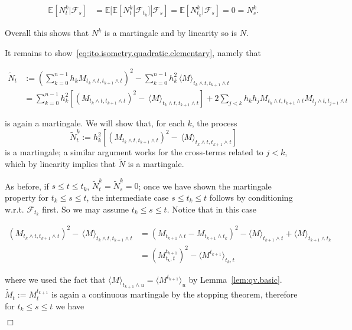 \documentclass{article}
\newcommand{\coloneq}{:=}
\newcommand{\textbf}[1]{\text{{\bfseries{#1}}}}
\newenvironment{proof}{\noindent\textbf{Proof\ }}{\hspace*{\fill}$\Box$\medskip}
\newcommand{\1}{\1}
\begin{document}
{\begin{proof}
  \begin{align*}
    \mathbb{E} [N^k_t | \mathcal{F}_s] & =\mathbb{E} [\mathbb{E} [N^k_t |
    \mathcal{F}_{t_k}] | \mathcal{F}_s] =\mathbb{E} [N^k_{t_k} |
    \mathcal{F}_s] = 0 = N^k_s .
  \end{align*}
  
  Overall this shows that $N^k$ is a martingale and by linearity so is $N$.
  
  It remains to show~\eqref{eq:ito.isometry.quadratic.elementary}, namely that
  
  \begin{align*}
    \tilde{N}_t & \coloneq \left( \sum_{k = 0}^{n - 1} h_k M_{t_k \wedge t,
    t_{k + 1} \wedge t} \right)^2 - \sum_{k = 0}^{n - 1} h_k^2 \, \langle M
    \rangle_{t_k \wedge t, t_{k + 1} \wedge t}\\
    & = \sum_{k = 0}^{n - 1} h_k^2 \left[ (M_{t_k \wedge t, t_{k + 1} \wedge
    t})^2 - \, \langle M \rangle_{t_k \wedge t, t_{k + 1} \wedge t} \right] +
    2 \sum_{j < k} h_k h_j M_{t_k \wedge t, t_{k + 1} \wedge t} M_{t_j \wedge
    t, t_{j + 1} \wedge t}
  \end{align*}
  
  is again a martingale. We will show that, for each $k$, the process
  \[ \tilde{N}^k_t \coloneq h_k^2 \left[ (M_{t_k \wedge t, t_{k + 1} \wedge
     t})^2 - \, \langle M \rangle_{t_k \wedge t, t_{k + 1} \wedge t} \right]
  \]
  is a martingale; a similar argument works for the cross-terms related to $j
  < k$, which by linearity implies that $\tilde{N}$ is a martingale.
  
  As before, if $s \leqslant t \leqslant t_k$, $\tilde{N}^k_t = \tilde{N}^k_s
  = 0$; once we have shown the martingale property for $t_k \leqslant s
  \leqslant t$, the intermediate case $s \leqslant t_k \leqslant t$ follows by
  conditioning w.r.t. $\mathcal{F}_{t_k}$ first. So we may assume $t_k
  \leqslant s \leqslant t$. Notice that in this case
  
  \begin{align*}
    (M_{t_k \wedge t, t_{k + 1} \wedge t})^2 - \, \langle M \rangle_{t_k
    \wedge t, t_{k + 1} \wedge t} & = (M_{t_{k + 1} \wedge t} - M_{t_{k + 1}
    \wedge t_k})^2 - \langle M \rangle_{t_{k + 1} \wedge t} + \langle M
    \rangle_{t_{k + 1} \wedge t_k}\\
    & = (M^{t_{k + 1}}_{t_k, t})^2 - \langle M^{t_{k + 1}} \rangle_{t_k, t}
  \end{align*}
  
  where we used the fact that $\langle M \rangle_{t_{k + 1} \wedge u} =
  \langle M^{t_{k + 1}} \rangle_u$ by Lemma~\ref{lem:qv.basic}. $\tilde{M}_t
  \coloneq M^{t_{k + 1}}_t$ is again a continuous martingale by the stopping
  theorem, therefore for $t_k \leqslant s \leqslant t$ we have
  

\end{proof}}
\end{document}
